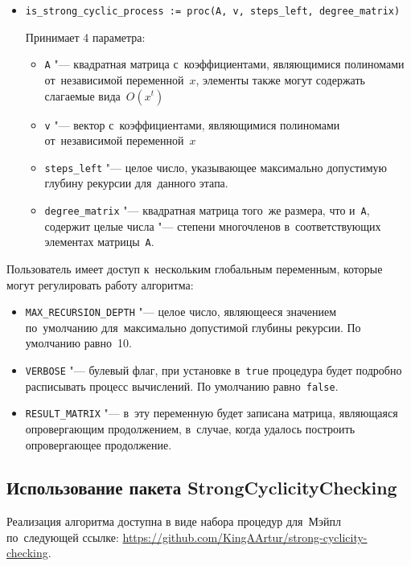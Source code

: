 \begin{itemize}
    \item
        \verb|is_strong_cyclic_process := proc(A, v, steps_left, degree_matrix)|

        Принимает 4 параметра:
        \begin{itemize}
            \item
                \verb|A| "--- квадратная матрица с~коэффициентами, являющимися полиномами от~независимой переменной~$x$,
                элементы также могут содержать слагаемые вида~$O(x^t)$
            \item
                \verb|v| "--- вектор с~коэффициентами, являющимися полиномами от~независимой переменной~$x$
            \item
                \verb|steps_left| "--- целое число,
                указывающее максимально допустимую глубину рекурсии для~данного этапа.
            \item
                \verb|degree_matrix| "--- квадратная матрица того~же размера, что и~\verb|A|,
                содержит целые числа "--- степени многочленов в~соответствующих элементах матрицы~\verb|A|.
        \end{itemize}
\end{itemize}


Пользователь имеет доступ к~нескольким глобальным переменным, которые могут регулировать работу алгоритма:
\begin{itemize}
    \item
        \verb|MAX_RECURSION_DEPTH| "--- целое число, являющееся значением по~умолчанию для~максимально допустимой глубины рекурсии.
        По умолчанию равно~10.
    \item
        \verb|VERBOSE| "--- булевый флаг, при установке в~\verb|true| процедура будет подробно расписывать процесс вычислений.
        По умолчанию равно~\verb|false|.
    \item
        \verb|RESULT_MATRIX| "--- в~эту переменную будет записана матрица, являющаяся опровергающим продолжением,
        в~случае, когда удалось построить опровергающее продолжение.
\end{itemize}


\newpage
\subsection{Использование пакета StrongCyclicityChecking}

Реализация алгоритма доступна в виде набора процедур для~Мэйпл по~следующей ссылке:
\url{https://github.com/KingAArtur/strong-cyclicity-checking}.

